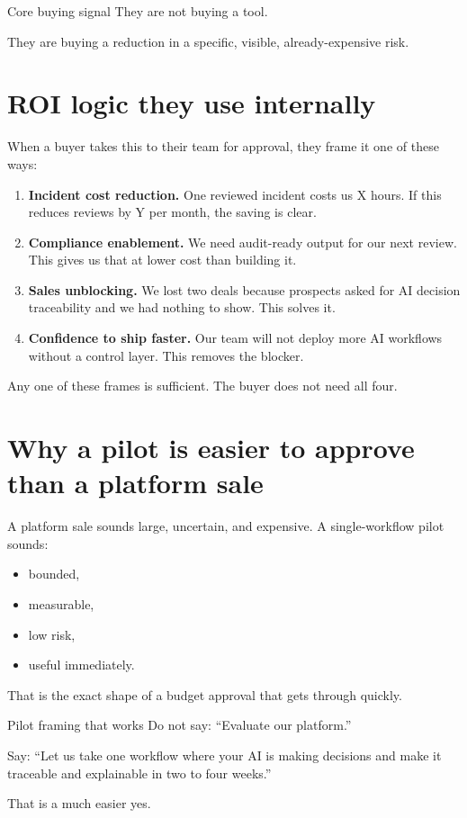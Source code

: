 \begin{conceptbox}{Core buying signal}
They are not buying a tool.

They are buying a reduction in a specific, visible, already-expensive risk.
\end{conceptbox}

\section{ROI logic they use internally}

When a buyer takes this to their team for approval, they frame it one of these ways:

\begin{enumerate}
  \item \textbf{Incident cost reduction.} One reviewed incident costs us X hours. If this reduces reviews by Y per month, the saving is clear.
  \item \textbf{Compliance enablement.} We need audit-ready output for our next review. This gives us that at lower cost than building it.
  \item \textbf{Sales unblocking.} We lost two deals because prospects asked for AI decision traceability and we had nothing to show. This solves it.
  \item \textbf{Confidence to ship faster.} Our team will not deploy more AI workflows without a control layer. This removes the blocker.
\end{enumerate}

Any one of these frames is sufficient.
The buyer does not need all four.

\section{Why a pilot is easier to approve than a platform sale}

A platform sale sounds large, uncertain, and expensive.
A single-workflow pilot sounds:

\begin{itemize}
  \item bounded,
  \item measurable,
  \item low risk,
  \item useful immediately.
\end{itemize}

That is the exact shape of a budget approval that gets through quickly.

\begin{insightbox}{Pilot framing that works}
Do not say: ``Evaluate our platform.''

Say: ``Let us take one workflow where your AI is making decisions and make it traceable and explainable in two to four weeks.''

That is a much easier yes.
\end{insightbox}
